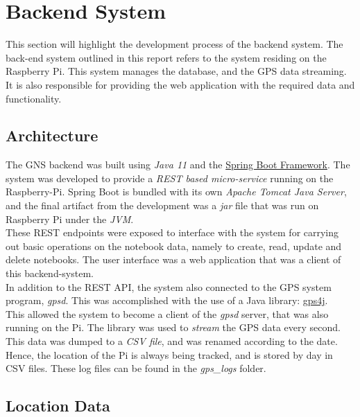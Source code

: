 
\section{Backend System}
This section will highlight the development process of the backend system. The back-end system outlined in this report refers to the system residing on the Raspberry Pi. This system manages the database, and the GPS data streaming. It is also responsible for providing the web application with the required data and functionality.\\

\subsection{Architecture}
The GNS backend was built using \textit{Java 11} and the \href{https://spring.io}{Spring Boot Framework}\cite{spring-boot}. The system was developed to provide a \textit{REST based micro-service} running on the Raspberry-Pi. Spring Boot is bundled with its own \textit{Apache Tomcat Java Server}\cite{apache-tomcat}, and the final artifact from the development was a \textit{jar} file that was run on Raspberry Pi under the \textit{JVM}.\\

These REST endpoints were exposed to interface with the system for carrying out basic operations on the notebook data, namely to create, read, update and delete notebooks. The user interface was a web application that was a client of this backend-system.\\

In addition to the REST API, the system also connected to the GPS system program, \textit{gpsd}. This was accomplished with the use of a Java library: \href{https://github.com/ivkos/gpsd4j}{gps4j}\cite{gpsd4j}.\\

This allowed the system to become a client of the \textit{gpsd} server, that was also running on the Pi. The library was used to \textit{stream} the GPS data every second. This data was dumped to a \textit{CSV file}, and was renamed according to the date. Hence, the location of the Pi is always being tracked, and is stored by day in CSV files. These log files can be found in the \textit{gps\_logs} folder.\\

\subsection{Location Data}

